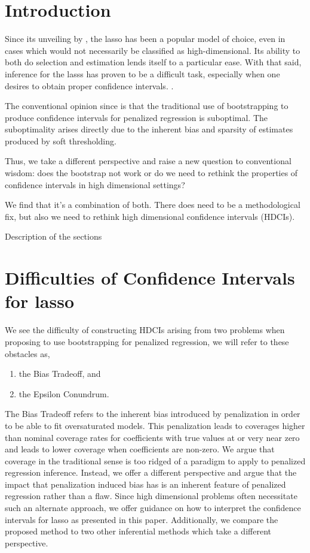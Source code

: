 \section{Introduction}

Since its unveiling by \cite{Tibshirani1996}, the lasso has been a popular model of choice, even in cases which would not necessarily be classified as high-dimensional. Its ability to both do selection and estimation lends itself to a particular ease. With that said, inference for the lasss has proven to be a difficult task, especially when one desires to obtain proper confidence intervals. .

The conventional opinion since \cite{Chatterjee2010} is that the traditional use of bootstrapping to produce confidence intervals for penalized regression is suboptimal. The suboptimality arises directly due to the inherent bias and sparsity of estimates produced by soft thresholding.

Thus, we take a different perspective and raise a new question to conventional wisdom: does the bootstrap not work or do we need to rethink the properties of confidence intervals in high dimensional settings?

We find that it's a combination of both. There does need to be a methodological fix, but also we need to rethink high dimensional confidence intervals (HDCIs).

Description of the sections

\section{Difficulties of Confidence Intervals for lasso}

We see the difficulty of constructing HDCIs arising from two problems when proposing to use bootstrapping for penalized regression, we will refer to these obstacles as,

\begin{enumerate}
\item the Bias Tradeoff, and
\item the Epsilon Conundrum.
\end{enumerate}

The Bias Tradeoff refers to the inherent bias introduced by penalization in order to be able to fit oversaturated models. This penalization leads to coverages higher than nominal coverage rates for coefficients with true values at or very near zero and leads to lower coverage when coefficients are non-zero. We argue that coverage in the traditional sense is too ridged of a paradigm to apply to penalized regression inference. Instead, we offer a different perspective and argue that the impact that penalization induced bias has is an inherent feature of penalized regression rather than a flaw. Since high dimensional problems often necessitate such an alternate approach, we offer guidance on how to interpret the confidence intervals for lasso as presented in this paper. Additionally, we compare the proposed method to two other inferential methods which take a different perspective.


